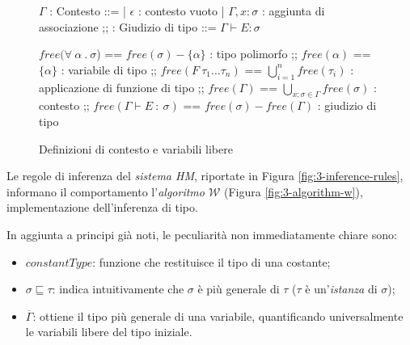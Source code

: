 \begin{figure}
    \vspace{4mm}
    \begin{spacedbnf}
        $\Gamma$ : \small{Contesto} ::=
        | $\epsilon$ : \small{contesto vuoto}
        | $\Gamma, x \colon \sigma$ : \small{aggiunta di associazione}
        ;;
        : \small{Giudizio di tipo} ::= $\Gamma \vdash E \colon \sigma$
    \end{spacedbnf}
    \par\vspace{10mm}
    \begin{spacedbnf}
        $free(\forall\ \alpha\ \mathord{.}\ \sigma$) == $free(\sigma) - \{\alpha\}$ : \small{tipo polimorfo}
        ;;
        $free(\alpha)$ == $\{\alpha\}$ : \small{variabile di tipo}
        ;;
        $free(F\ \tau_1\ldots\tau_n)$ == $\bigcup\limits_{i=1}^{n} free(\tau_i)$ : \small{applicazione di funzione di tipo}
        ;;
        $free(\Gamma)$ == $\bigcup\limits_{x\colon\sigma\in\Gamma} free(\sigma)$ : \small{contesto}
        ;;
        $free(\Gamma\vdash E\ \colon\ \sigma)$ == $free(\sigma) - free(\Gamma)$ : \small{giudizio di tipo}
    \end{spacedbnf}
    \caption{Definizioni di contesto e variabili libere}
    \label{fig:3-context-free-variables}
    \vspace{4mm}
\end{figure}

\newpage

\noindent Le regole di inferenza del \textit{sistema HM}, riportate in Figura \ref{fig:3-inference-rules},
informano il comportamento l'\textit{algoritmo $\mathcal{W}$} (Figura \ref{fig:3-algorithm-w}), implementazione dell'inferenza di tipo.

\noindent In aggiunta a principi già noti, le peculiarità non immediatamente chiare sono:
\begin{itemize}
    \item $constantType$: funzione che restituisce il tipo di una costante;
    \item $\sigma \sqsubseteq \tau$: indica intuitivamente che $\sigma$ è più generale di $\tau$
          ($\tau$ è un'\textit{istanza} di $\sigma$);
    \item $\overline{\Gamma}$: ottiene il tipo più generale di una variabile, quantificando universalmente le variabili libere del tipo iniziale.
\end{itemize}

